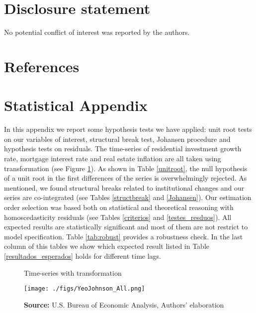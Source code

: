 \documentclass[12pt, a4paper]{article}
\begin{document}
\section*{Disclosure statement}
\label{sec:orgf18907d}
No potential conflict of interest was reported by the authors.

\section*{References}
\label{sec:org4928a58}
\printbibliography[heading=none]


\appendix
\section{Statistical Appendix}
\label{sec:orge00ebba}
\label{appen:A}

In this appendix we report some hypothesis tests we have applied: unit root tests on our variables of interest, structural break test, Johansen procedure and hypothesis tests on residuals.
The time-series of residential investment growth rate, mortgage interest rate and real estate inflation are all taken using \textcite{yeo_new_2000} transformation (see Figure \ref{YeoJhonson}).
As shown in Table \ref{unitroot}, the null hypothesis of a unit root in the first differences of the series is overwhelmingly rejected.
As mentioned, we found structural breaks related to institutional changes and our series are co-integrated (see Tables \ref{structbreak} and \ref{Johansen}).
Our estimation order selection was based both on statistical and theoretical reasoning with homoscedasticity residuals (see Tables \ref{criterios} and \ref{testes_resduos}).
All expected results are statistically significant and most of them are not restrict to model specification.
Table \ref{tab:robust} provides a robustness check.
In the last column of this tables we show which expected result listed in Table \ref{resultados_esperados} holds for different time lags.

\begin{figure}[htb]
	\centering
	\caption{Time-series with \textcite{yeo_new_2000} transformation}
	\label{YeoJhonson}
	\texttt{[image: ./figs/YeoJohnson\_All.png]}
	\caption*{\textbf{Source:} U.S. Bureau of Economic Analysis, Authors' elaboration}
\end{figure}






\end{document}
